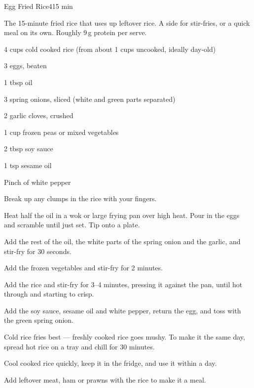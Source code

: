 \begin{recipebox}{Egg Fried Rice}{4}{15 min}

The 15-minute fried rice that uses up leftover rice. A side for stir-fries,
or a quick meal on its own. Roughly 9\,g protein per serve.

\begin{ingredients}
  \item 4 cups cold cooked rice (from about 1 cups uncooked, ideally day-old)
  \item 3 eggs, beaten
  \item 1 tbsp oil
  \item 3 spring onions, sliced (white and green parts separated)
  \item 2 garlic cloves, crushed
  \item 1 cup frozen peas or mixed vegetables
  \item 2 tbsp soy sauce
  \item 1 tsp sesame oil
  \item Pinch of white pepper
\end{ingredients}

\begin{method}
  \item Break up any clumps in the rice with your fingers.
  \item Heat half the oil in a wok or large frying pan over high heat. Pour in the eggs and scramble until just set. Tip onto a plate.
  \item Add the rest of the oil, the white parts of the spring onion and the garlic, and stir-fry for 30 seconds.
  \item Add the frozen vegetables and stir-fry for 2 minutes.
  \item Add the rice and stir-fry for 3--4 minutes, pressing it against the pan, until hot through and starting to crisp.
  \item Add the soy sauce, sesame oil and white pepper, return the egg, and toss with the green spring onion.
\end{method}

\begin{notelist}
  \item Cold rice fries best --- freshly cooked rice goes mushy. To make it the same day, spread hot rice on a tray and chill for 30 minutes.
  \item Cool cooked rice quickly, keep it in the fridge, and use it within a day.
  \item Add leftover meat, ham or prawns with the rice to make it a meal.
\end{notelist}

\end{recipebox}
